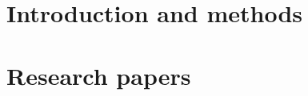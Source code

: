 \documentclass[10pt,twoside,openright]{memoir}
\begin{document}


\frontmatter
\setcounter{page}{3}

\cleardoublepage

\cleardoublepage

\cleardoublepage
\tableofcontents
\cleardoublepage
\listoffigures
\cleardoublepage
\listoftables
\cleardoublepage


\mainmatter
\part[Part I]{Introduction and methods}
\pagestyle{ruled}









\appendix



\backmatter
\printbibliography[title=References]

\makeatletter
\def\pagenumbering#1{%
  \gdef\thepage{\csname @#1\endcsname \c@page}}
\makeatother

\mainmatter
\part[Part II]{Research papers}
\pagenumbering{gobble}
\pagestyle{cleared}

\end{document}
